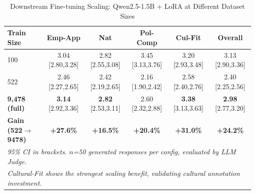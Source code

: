 \documentclass[11pt]{article}
\begin{document}
\begin{table}[t]
\begin{table}[t]
\centering
\caption{Downstream Fine-tuning Scaling: Qwen2.5-1.5B + LoRA at Different Dataset Sizes}
\label{tab:data_ablation}
\begin{tabular}{lccccc}
\toprule
\textbf{Train Size} & \textbf{Emp-App} & \textbf{Nat} & \textbf{Pol-Comp} & \textbf{Cul-Fit} & \textbf{Overall} \\
\midrule
100 & 3.04 {\scriptsize[2.80,3.28]} & 2.82 {\scriptsize[2.55,3.08]} & 3.45 {\scriptsize[3.13,3.76]} & 3.20 {\scriptsize[2.93,3.48]} & 3.13 {\scriptsize[2.90,3.36]} \\
522 & 2.46 {\scriptsize[2.27,2.65]} & 2.42 {\scriptsize[2.19,2.65]} & 2.16 {\scriptsize[1.90,2.42]} & 2.58 {\scriptsize[2.40,2.76]} & 2.40 {\scriptsize[2.25,2.56]} \\
\textbf{9,478 (full)} & \textbf{3.14} {\scriptsize[2.92,3.36]} & \textbf{2.82} {\scriptsize[2.53,3.11]} & 2.60 {\scriptsize[2.32,2.88]} & \textbf{3.38} {\scriptsize[3.13,3.63]} & \textbf{2.98} {\scriptsize[2.77,3.20]} \\
\midrule
\textbf{Gain (522$\to$9478)} & \textbf{+27.6\%} & \textbf{+16.5\%} & \textbf{+20.4\%} & \textbf{+31.0\%} & \textbf{+24.2\%} \\
\midrule
\multicolumn{6}{l}{\footnotesize \textit{95\% CI in brackets. $n$=50 generated responses per config, evaluated by LLM Judge.}} \\
\multicolumn{6}{l}{\footnotesize \textit{Cultural-Fit shows the strongest scaling benefit, validating cultural annotation investment.}} \\
\bottomrule
\end{tabular}
\end{table}



\end{table}
\end{document}
